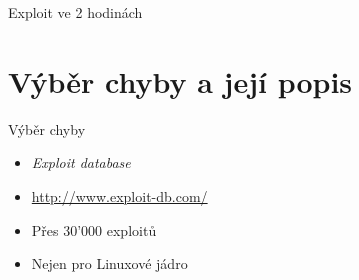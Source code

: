 


\subtitle{XIII. Exploit ve 2 hodinách}
\date{13. 12. \the\year}

\newcommand\kgr{\textsc{kGraft}\xspace}




\frame{\titlepage}


\begin{frame}{Exploit ve 2 hodinách}

  \tableofcontents

\end{frame}

\section{Výběr chyby a její popis}
\frame{\sectionpage}

\begin{frame}{Výběr chyby}

  \begin{itemize}
    \item \emph{Exploit database}
    \item \url{http://www.exploit-db.com/}
    \item Přes 30'000 exploitů
    \item Nejen pro Linuxové jádro
  \end{itemize}

  \bigskip
  \pause

  \begin{center}
  \end{center}

\end{frame}

